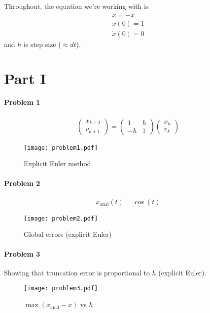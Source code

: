 \documentclass[12pt, oneside, letterpaper, fleqn]{article}
\begin{document}
Throughout, the equation we're working with is
\begin{gather*}
\ddot{x} = -x\\
x(0) = 1\\
\dot{x}(0) = 0
\end{gather*}
and $h$ is step size ($\approx dt$).

\section{Part I}
\paragraph{Problem 1}
\begin{gather*}
\begin{pmatrix}x_{k+1}\\v_{k+1}\end{pmatrix}
= \begin{pmatrix}1 & h\\ -h & 1\end{pmatrix}
\begin{pmatrix}x_k\\v_k\end{pmatrix}
\end{gather*}
\begin{figure}[htbp]
\caption{Explicit Euler method}
\texttt{[image: problem1.pdf]}
\end{figure}

\pagebreak
\paragraph{Problem 2}
\begin{gather*}
x_\text{anal}(t) = \cos(t)
\end{gather*}
\begin{figure}[htbp]
\caption{Global errors (explicit Euler)}
\texttt{[image: problem2.pdf]}
\end{figure}

\pagebreak
\paragraph{Problem 3}
Showing that truncation error is proportional to $h$ (explicit Euler).
\begin{figure}[htbp]
\caption{$\max(x_\text{anal} - x)$ vs $h$}
\texttt{[image: problem3.pdf]}
\end{figure}
\end{document}
